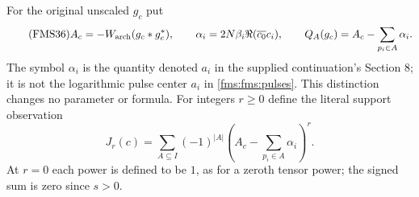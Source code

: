 For the original unscaled $g_c$ put
\begin{equation}\tag{FMS36}\label{fms:fms:cornerparameters}
 A_c=-W_{\rm arch}(g_c*g_c^*),\qquad
 \alpha_i=2N\beta_i\Re(\overline{c_0}c_i),\qquad
 Q_A(g_c)=A_c-\sum_{p_i\in A}\alpha_i.
\end{equation}
The symbol $\alpha_i$ is the quantity denoted $a_i$ in the
supplied continuation's Section 8; it is not the logarithmic
pulse center $a_i$ in \eqref{fms:fms:pulses}. This distinction changes
no parameter or formula.
For integers $r\ge0$ define the literal support observation
\begin{equation}\tag{FMS37}\label{fms:fms:jr}
 J_r(c)=\sum_{A\subseteq I}(-1)^{|A|}
                   \left(A_c-\sum_{p_i\in A}\alpha_i\right)^r.
\end{equation}
At $r=0$ each power is defined to be $1$, as for a zeroth tensor
power; the signed sum is zero since $s>0$.

